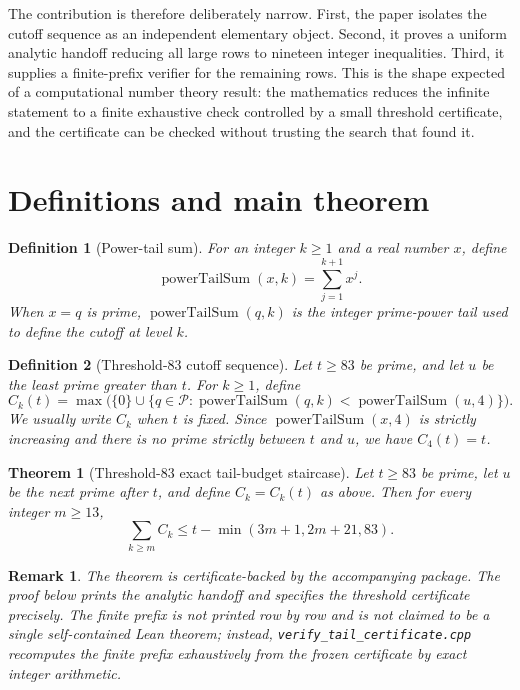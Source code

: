 \documentclass[11pt]{article}
\newtheorem{theorem}{Theorem}
\newtheorem{definition}{Definition}
\newtheorem{remark}{Remark}
\newcommand{\Pow}{\operatorname{powerTailSum}}
\newcommand{\Primes}{\mathcal P}
\begin{document}
The contribution is therefore deliberately narrow.  First, the paper isolates
the cutoff sequence as an independent elementary object.  Second, it proves a
uniform analytic handoff reducing all large rows to nineteen integer
inequalities.  Third, it supplies a finite-prefix verifier for the
remaining rows.  This is the shape expected of a computational number theory
result: the mathematics reduces the infinite statement to a finite exhaustive
check controlled by a small threshold certificate, and the certificate can be
checked without trusting the search that found it.

\section{Definitions and main theorem}

\begin{definition}[Power-tail sum]
For an integer \(k\ge1\) and a real number \(x\), define
\[
  \Pow(x,k)=\sum_{j=1}^{k+1}x^j.
\]
When \(x=q\) is prime, \(\Pow(q,k)\) is the integer prime-power tail used
to define the cutoff at level \(k\).
\end{definition}

\begin{definition}[Threshold-\(83\) cutoff sequence]
Let \(t\ge83\) be prime, and let \(u\) be the least prime greater than \(t\).
For \(k\ge1\), define
\[
  C_k(t)=
  \max\bigl(\{0\}\cup
  \{q\in\Primes:\Pow(q,k)<\Pow(u,4)\}\bigr).
\]
We usually write \(C_k\) when \(t\) is fixed.  Since \(\Pow(x,4)\) is
strictly increasing and there is no prime strictly between \(t\) and \(u\),
we have \(C_4(t)=t\).
\end{definition}

\begin{theorem}[Threshold-\(83\) exact tail-budget staircase]
\label{thm:threshold83}
Let \(t\ge83\) be prime, let \(u\) be the next prime after \(t\), and define
\(C_k=C_k(t)\) as above.  Then for every integer \(m\ge13\),
\[
  \sum_{k\ge m} C_k
  \le
  t-\min(3m+1,2m+21,83).
\]
\end{theorem}

\begin{remark}
The theorem is certificate-backed by the accompanying package.  The proof
below prints the analytic handoff and specifies the threshold certificate
precisely.  The finite prefix is not printed row by row and is not claimed to
be a single self-contained Lean theorem; instead,
\nolinkurl{verify_tail_certificate.cpp} recomputes the finite prefix
exhaustively from the frozen certificate by exact integer arithmetic.
\end{remark}
\end{document}
